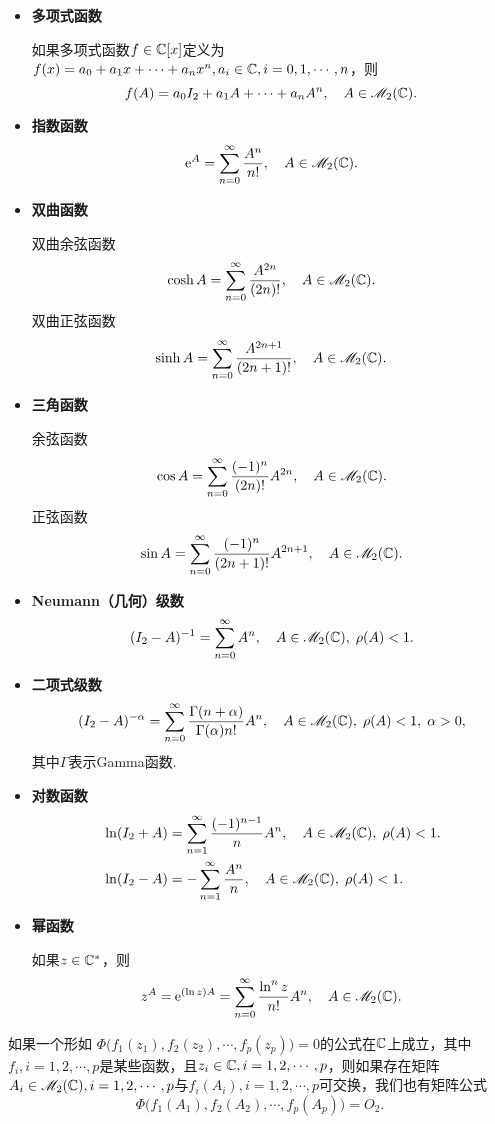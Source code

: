 \begin{mybox}
  \begin{itemize}
    \item {\bfseries 多项式函数}

    如果多项式函数$f\in\mathbb C[x]$定义为$f(x)=a_0+a_1x+\cdots+a_nx^n,a_i\in\mathbb C,
        i=0,1,\cdots,n $，则
        \[
          f(A) = a_0I_2 + a_1A + \cdots + a_nA^n,\quad A\in\mathscr M_2(\mathbb C).
        \]
    \item {\bfseries 指数函数}
        \[
          \operatorname{\!\!\;\mathrm e}^A = \sum_{n=0}^\infty \frac{A^n}{n!},\quad A\in\mathscr M_2(\mathbb C).
        \]
    \item {\bfseries 双曲函数}

    双曲余弦函数
    \[
      \cosh A = \sum_{n=0}^\infty \frac{A^{2n}}{(2n)!},\quad A\in\mathscr M_2(\mathbb C).
    \]
    双曲正弦函数
    \[
      \sinh A = \sum_{n=0}^\infty \frac{A^{2n+1}}{(2n+1)!},\quad A\in\mathscr M_2(\mathbb C).
    \]
    \item {\bfseries 三角函数}

    余弦函数
    \[
      \cos A = \sum_{n=0}^\infty \frac{(-1)^n}{(2n)!} A^{2n},\quad A\in\mathscr M_2(\mathbb C).
    \]
    正弦函数
    \[
      \sin A = \sum_{n=0}^\infty \frac{(-1)^n}{(2n+1)!}A^{2n+1},\quad A\in\mathscr M_2(\mathbb C).
    \]
    \item {\bfseries Neumann{\hyds （}几何{\hyds ）}级数}
    \[
      (I_2 - A)^{-1} = \sum_{n=0}^\infty A^n,\quad A\in\mathscr M_2(\mathbb C),\;\rho(A)<1.
    \]
    \item {\bfseries 二项式级数}
    \[
      (I_2 - A)^{-\alpha} = \sum_{n=0}^\infty \frac{\Gamma(n+\alpha)}{\Gamma(\alpha)n!}A^n,\quad A\in\mathscr M_2(\mathbb C),\;\rho(A)<1,\;\alpha>0,
    \]
    其中$\Gamma$表示{\kaishu Gamma}函数.
    \item {\bfseries 对数函数}
    \begin{align*}
      & \ln(I_2 + A) = \sum_{n=1}^\infty \frac{(-1)^{n-1}}n A^n,\quad A\in\mathscr M_2(\mathbb C), \;\rho(A)<1. \\
      & \ln(I_2 - A) = - \sum_{n=1}^\infty \frac{A^n}n,\quad A\in\mathscr M_2(\mathbb C), \;\rho(A)<1.
    \end{align*}
    \item {\bfseries 幂函数}

    如果$z\in\mathbb C^\ast$，则
    \[
      z^A = \operatorname{\!\!\;\mathrm e}^{(\ln z)A} = \sum_{n=0}^\infty \frac{\ln^nz}{n!}A^n,\quad A\in\mathscr M_2(\mathbb C).
    \]
  \end{itemize}
\end{mybox}

\begin{nota}
  如果一个形如
  $\varPhi\big(f_1(z_1),f_2(z_2),\cdots,f_p(z_p)\big)=0$的公式在$\mathbb C$上成立，其中$f_i,i=1,2,\cdots,p$是某些函数，且$z_i\in\mathbb C,i=1,2,\cdots,p$，则如果存在矩阵$A_i\in\mathscr M_2(\mathbb C),i=1,2,\cdots,p$与$f_i(A_i),
  i=1,2,\cdots,p$可交换，我们也有矩阵公式
  \[
    \varPhi\big(f_1(A_1),f_2(A_2),\cdots,
    f_p(A_p)\big)=O_2.
  \]
\end{nota}

